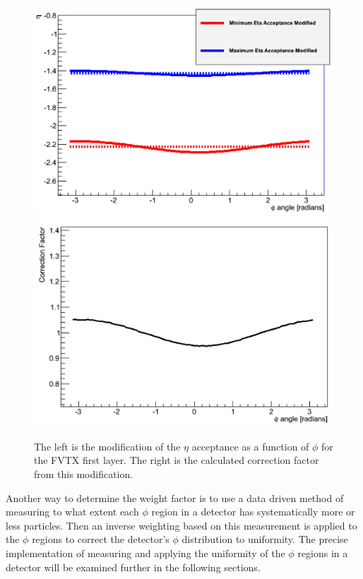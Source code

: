 \begin{figure}[h!]
\begin{center}
\includegraphics[width=0.47\linewidth]{figs/eta_modification.png}
\includegraphics[width=0.47\linewidth]{figs/analytic_correction.png}
\caption{The left is the modification of the $\eta$ acceptance as a function of $\phi$ for the FVTX first layer. The right is the calculated correction factor from this modification.}
\label{fig:analytic_corr}
\end{center}
\end{figure}

Another way to determine the weight factor is to use a data driven method of measuring to what extent each $\phi$ region in a detector has systematically more or less particles. Then an inverse weighting based on this measurement is applied to the $\phi$ regions to correct the detector's $\phi$ distribution to uniformity. The precise implementation of measuring and applying the uniformity of the $\phi$ regions in a detector will be examined further in the following sections.

